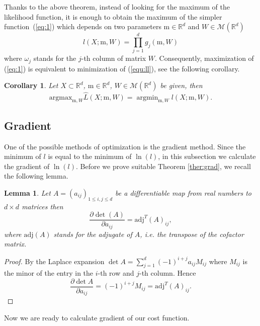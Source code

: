 \documentclass[12pt]{article}
\def\R{\mathbb{R}}
\def\w{\omega}
\def\m{\mathrm{m}}
\def\M{\mathcal{M}}
\DeclareMathOperator*{\argmin}{argmin}
\newtheorem{lemma}{Lemma}[section]
\newtheorem{corollary}{Corollary}[section]
\theoremstyle{definition}
\begin{document}
Thanks to the above theorem, instead of looking for the maximum of the likelihood function, it is enough to obtain the maximum of the simpler function~(\ref{eq:1}) which depends on two parameters $\m \in \R^d$ and $W \in \M(\R^d)$
\begin{equation}\label{equ:ll}
{l}(X;\m,W) = \prod_{j=1}^{d} {g}_{j}(\m,W)
\end{equation}
where $\w_{j}$ stands for the $j$-th column of matrix $W$. 
Consequently, maximization of (\ref{eq:1}) is equivalent to minimization of  (\ref{equ:ll}), see the following corollary.

\begin{corollary}\label{c2}
Let $X \subset \R^d$, $\m \in \R^d$, $W \in \M(\R^d)$ be given, then
$$
 \text{argmax}_{\m,W} \hat{L}(X;\m,W) =  \argmin_{\m,W} {l}(X;\m,W).
$$
\end{corollary}
%


\subsection{Gradient}



One of the possible methods of optimization is the gradient method. Since the minimum of ${l}$ is equal to the minimum of $\ln({l})$, in this subsection we calculate the gradient of $\ln({l})$. 
Before we prove suitable Theorem \ref{ther:grad}, we recall the following lemma. 

\begin{lemma}\label{jacobi}
Let $A = (a_{ij})_{1 \leq i,j \leq d}$ be a differentiable map from real numbers to $d \times d$ matrices then
\begin{equation}
\frac{\partial \det(A)}{\partial a_{ij}} = \mathrm{adj}^T(A)_{ij},
\end{equation}
where $\mathrm{adj}(A)$ stands for the adjugate of $A$, i.e. the transpose of the cofactor matrix.
\end{lemma}
\begin{proof}
By the Laplace expansion $\det A = \sum\limits_{j=1}^{d} (-1)^{i+j} a_{ij} M_{ij}$ where $M_{ij}$ is the minor of the entry in the $i$-th row and $j$-th column. Hence
$$\frac{\partial \det A}{\partial a_{ij}} = (-1)^{i+j} M_{ij} = \mathrm{adj}^T(A)_{ij}.$$
\end{proof}
Now we are ready to calculate gradient of our cost function.
\end{document}

